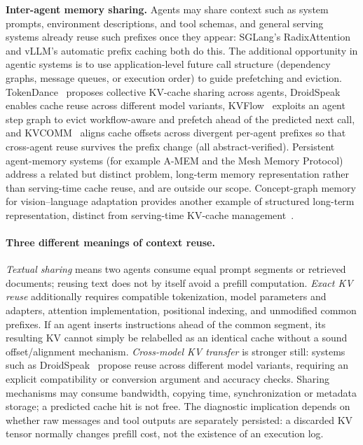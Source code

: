 \textbf{Inter-agent memory sharing.} Agents may share context such as system prompts, environment descriptions, and tool schemas, and general serving systems already reuse such prefixes once they appear: SGLang's RadixAttention and vLLM's automatic prefix caching both do this. The additional opportunity in agentic systems is to use application-level future call structure (dependency graphs, message queues, or execution order) to guide prefetching and eviction. TokenDance~\cite{tokendance2026} proposes collective KV-cache sharing across agents, DroidSpeak~\cite{droidspeak2024} enables cache reuse across different model variants, KVFlow~\cite{kvflow2025} exploits an agent step graph to evict workflow-aware and prefetch ahead of the predicted next call, and KVCOMM~\cite{kvcomm2025} aligns cache offsets across divergent per-agent prefixes so that cross-agent reuse survives the prefix change (all abstract-verified). Persistent agent-memory systems (for example A-MEM and the Mesh Memory Protocol) address a related but distinct problem, long-term memory representation rather than serving-time cache reuse, and are outside our scope. Concept-graph memory for vision--language adaptation provides another example of structured long-term representation, distinct from serving-time KV-cache management~\cite{zhou2026comem}.

\paragraph*{Three different meanings of context reuse.} \emph{Textual sharing} means two agents consume equal prompt segments or retrieved documents; reusing text does not by itself avoid a prefill computation. \emph{Exact KV reuse} additionally requires compatible tokenization, model parameters and adapters, attention implementation, positional indexing, and unmodified common prefixes. If an agent inserts instructions ahead of the common segment, its resulting KV cannot simply be relabelled as an identical cache without a sound offset/alignment mechanism. \emph{Cross-model KV transfer} is stronger still: systems such as DroidSpeak~\cite{droidspeak2024} propose reuse across different model variants, requiring an explicit compatibility or conversion argument and accuracy checks. Sharing mechanisms may consume bandwidth, copying time, synchronization or metadata storage; a predicted cache hit is not free. The diagnostic implication depends on whether raw messages and tool outputs are separately persisted: a discarded KV tensor normally changes prefill cost, not the existence of an execution log.


